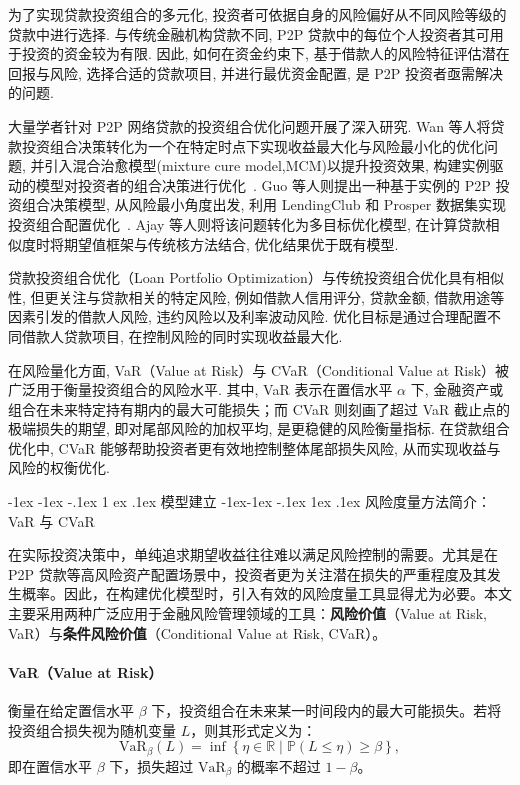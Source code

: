 \documentclass{write_paper}
\makeatletter
\renewcommand\section{\@startsection {section}{1}{\z@}%
                                   {-1ex \@plus -1ex \@minus -.1ex}%
                                   {1 ex \@plus.1ex}%
                                   {\normalfont\large\bfseries}}
\renewcommand\subsection{\@startsection{subsection}{2}{\z@}%
                                     {-1ex\@plus -1ex \@minus -.1ex}%
                                     {1ex \@plus .1ex}%
                                     {\normalfont \normalsize \bfseries}}
\makeatother
\begin{document}
为了实现贷款投资组合的多元化, 投资者可依据自身的风险偏好从不同风险等级的贷款中进行选择. 与传统金融机构贷款不同, P2P 贷款中的每位个人投资者其可用于投资的资金较为有限. 因此, 如何在资金约束下, 基于借款人的风险特征评估潜在回报与风险, 选择合适的贷款项目, 并进行最优资金配置, 是 P2P 投资者亟需解决的问题. 

大量学者针对 P2P 网络贷款的投资组合优化问题开展了深入研究. Wan 等人将贷款投资组合决策转化为一个在特定时点下实现收益最大化与风险最小化的优化问题, 并引入混合治愈模型(mixture cure model,MCM)以提升投资效果, 构建实例驱动的模型对投资者的组合决策进行优化~\cite{wan2023hybrid}. Guo 等人则提出一种基于实例的 P2P 投资组合决策模型, 从风险最小角度出发, 利用 LendingClub 和 Prosper 数据集实现投资组合配置优化~\cite{guo2016instance}. Ajay 等人则将该问题转化为多目标优化模型, 在计算贷款相似度时将期望值框架与传统核方法结合, 优化结果优于既有模型\cite{byanjankar2021data}.

贷款投资组合优化（Loan Portfolio Optimization）与传统投资组合优化具有相似性, 但更关注与贷款相关的特定风险, 例如借款人信用评分, 贷款金额, 借款用途等因素引发的借款人风险, 违约风险以及利率波动风险. 优化目标是通过合理配置不同借款人贷款项目, 在控制风险的同时实现收益最大化. 

在风险量化方面, VaR（Value at Risk）与 CVaR（Conditional Value at Risk）被广泛用于衡量投资组合的风险水平. 其中, VaR 表示在置信水平 $\alpha$ 下, 金融资产或组合在未来特定持有期内的最大可能损失；而 CVaR 则刻画了超过 VaR 截止点的极端损失的期望, 即对尾部风险的加权平均, 是更稳健的风险衡量指标. 在贷款组合优化中, CVaR 能够帮助投资者更有效地控制整体尾部损失风险, 从而实现收益与风险的权衡优化. 




\section{模型建立}
\subsection{风险度量方法简介：VaR 与 CVaR}

在实际投资决策中，单纯追求期望收益往往难以满足风险控制的需要。尤其是在 P2P 贷款等高风险资产配置场景中，投资者更为关注潜在损失的严重程度及其发生概率。因此，在构建优化模型时，引入有效的风险度量工具显得尤为必要。本文主要采用两种广泛应用于金融风险管理领域的工具：\textbf{风险价值}（Value at Risk, VaR）与\textbf{条件风险价值}（Conditional Value at Risk, CVaR）。

\paragraph{VaR（Value at Risk）} 衡量在给定置信水平 $\beta$ 下，投资组合在未来某一时间段内的最大可能损失。若将投资组合损失视为随机变量 $L$，则其形式定义为：
\[
\text{VaR}_\beta(L) = \inf \left\{ \eta \in \mathbb{R} \mid \mathbb{P}(L \leq \eta) \geq \beta \right\},
\]
即在置信水平 $\beta$ 下，损失超过 $\text{VaR}_\beta$ 的概率不超过 $1 - \beta$。
\end{document}
